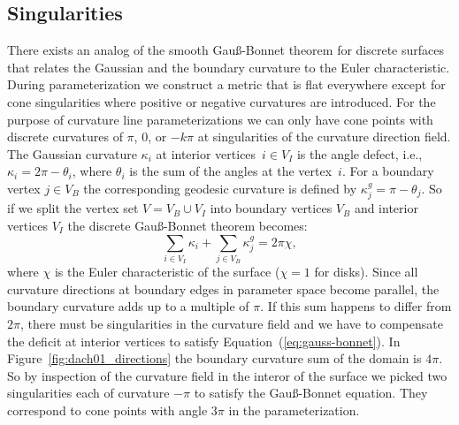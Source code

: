 \documentclass[twoside]{article}
\begin{document}
\subsection{Singularities}
\label{sub:singularities}
There exists an analog of the smooth Gau{\ss}-Bonnet theorem
for discrete surfaces that relates the Gaussian and the boundary curvature to
the Euler characteristic. During parameterization we construct a metric that is
flat everywhere except for cone singularities where positive or negative
curvatures are introduced. For the purpose of curvature line parameterizations
we can only have cone points with discrete curvatures of $\pi$, $0$, or $-k\pi$
at singularities of the curvature direction field. The Gaussian curvature
$\kappa_i$ at interior vertices~$i\in V_I$ is the angle defect, i.e., $\kappa_i =
2\pi-\theta_i$, where $\theta_i$ is the sum of the angles at the vertex~$i$.
For a boundary vertex $j\in V_B$ the corresponding geodesic curvature is defined by
$\kappa^g_j = \pi-\theta_j$. So if we split the vertex set $V = V_B \cup V_I$ into
boundary vertices $V_B$ and interior vertices $V_I$ the discrete
Gau{\ss}-Bonnet theorem becomes:
\begin{equation}
  \label{eq:gauss-bonnet} \sum_{i\in {V_I}}\kappa_i + \sum_{j\in
  V_B}\kappa^g_j = 2\pi \chi,
\end{equation} 
where $\chi$ is the Euler characteristic of the surface ($\chi = 1$ for disks).
Since all curvature directions at boundary edges in parameter space become parallel, the
boundary curvature adds up to a multiple of $\pi$. If this sum happens to
differ from $2\pi$, there must be singularities in the curvature field and we
have to compensate the deficit at interior vertices to satisfy
Equation~(\ref{eq:gauss-bonnet}). In Figure~\ref{fig:dach01_directions} the
boundary curvature sum of the domain is $4\pi$. So by inspection of the curvature field in the 
interor of the surface we picked two singularities each of curvature $-\pi$ to satisfy the 
Gau{\ss}-Bonnet equation. They correspond to cone points with angle $3\pi$ in the 
parameterization.
\end{document}
